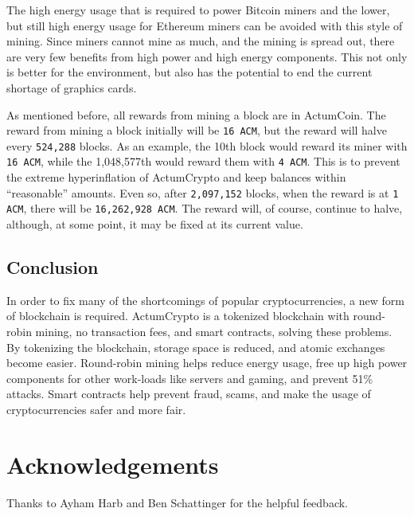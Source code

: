 \documentclass[letter]{article}
\begin{document}
The high energy usage that is required to power Bitcoin miners and the lower, but still high energy usage for Ethereum miners can be avoided with this style of mining. Since miners cannot mine as much, and the mining is spread out, there are very few benefits from high power and high energy components. This not only is better for the environment, but also has the potential to end the current shortage of graphics cards.

As mentioned before, all rewards from mining a block are in ActumCoin. The reward from mining a block initially will be \texttt{16 ACM}, but the reward will halve every \texttt{524,288} blocks. As an example, the 10th block would reward its miner with \texttt{16 ACM}, while the 1,048,577th would reward them with \texttt{4 ACM}. This is to prevent the extreme hyperinflation of ActumCrypto and keep balances within “reasonable” amounts. Even so, after \texttt{2,097,152} blocks, when the reward is at \texttt{1 ACM}, there will be \texttt{16,262,928 ACM}. The reward will, of course, continue to halve, although, at some point, it may be fixed at its current value.

\subsection{Conclusion}
In order to fix many of the shortcomings of popular cryptocurrencies, a new form of blockchain is required. ActumCrypto is a tokenized blockchain with round-robin mining, no transaction fees, and smart contracts, solving these problems. By tokenizing the blockchain, storage space is reduced, and atomic exchanges become easier. Round-robin mining helps reduce energy usage, free up high power components for other work-loads like servers and gaming, and prevent 51\% attacks. Smart contracts help prevent fraud, scams, and make the usage of cryptocurrencies safer and more fair.

\section{Acknowledgements}
Thanks to Ayham Harb and Ben Schattinger for the helpful feedback.

\newpage
\printbibliography
\end{document}
